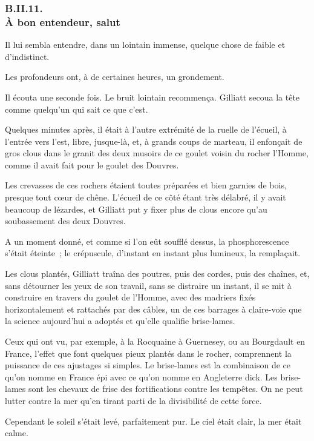 \documentclass[french,twoside]{book} %
\begin{document}
 \subsubsection[{B.II.11. À bon entendeur, salut}]{B.II.11. \\
À bon entendeur, salut}
\noindent Il lui sembla entendre, dans un lointain immense, quelque chose de faible et d’indistinct.\par
Les profondeurs ont, à de certaines heures, un grondement.\par
Il écouta une seconde fois. Le bruit lointain recommença. Gilliatt secoua la tête comme quelqu’un qui sait ce que c’est.\par
Quelques minutes après, il était à l’autre extrémité de la ruelle de l’écueil, à l’entrée vers l’est, libre, jusque-là, et, à grands coups de marteau, il enfonçait de gros clous dans le granit des deux musoirs de ce goulet voisin du rocher l’Homme, comme il avait fait pour le goulet des Douvres.\par
Les crevasses de ces rochers étaient toutes préparées et bien garnies de bois, presque tout cœur de chêne. L’écueil de ce côté étant très délabré, il y avait beaucoup de lézardes, et Gilliatt put y fixer plus de clous encore qu’au soubassement des deux Douvres.\par
 A un moment donné, et comme si l’on eût soufflé dessus, la phosphorescence s’était éteinte ; le crépuscule, d’instant en instant plus lumineux, la remplaçait.\par
Les clous plantés, Gilliatt traîna des poutres, puis des cordes, puis des chaînes, et, sans détourner les yeux de son travail, sans se distraire un instant, il se mit à construire en travers du goulet de l’Homme, avec des madriers fixés horizontalement et rattachés par des câbles, un de ces barrages à claire-voie que la science aujourd’hui a adoptés et qu’elle qualifie brise-lames.\par
Ceux qui ont vu, par exemple, à la Rocquaine à Guernesey, ou au Bourgdault en France, l’effet que font quelques pieux plantés dans le rocher, comprennent la puissance de ces ajustages si simples. Le brise-lames est la combinaison de ce qu’on nomme en France épi avec ce qu’on nomme en Angleterre dick. Les brise-lames sont les chevaux de frise des fortifications contre les tempêtes. On ne peut lutter contre la mer qu’en tirant parti de la divisibilité de cette force.\par
Cependant le soleil s’était levé, parfaitement pur. Le ciel était clair, la mer était calme.\par
\end{document}
